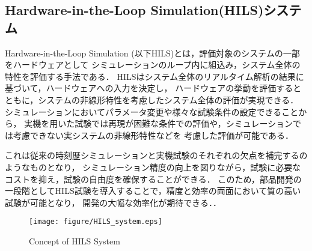 \documentclass[a4paper,12pt]{article_vdlab_sotsuron}
\begin{document}
\newpage
\subsection{Hardware-in-the-Loop Simulation(HILS)システム}
Hardware-in-the-Loop Simulation (以下HILS)とは，評価対象のシステムの一部をハードウェアとして
シミュレーションのループ内に組込み，システム全体の特性を評価する手法である．
HILSはシステム全体のリアルタイム解析の結果に基づいて，ハードウェアへの入力を決定し，
ハードウェアの挙動を評価するとともに，システムの非線形特性を考慮したシステム全体の評価が実現できる．
シミュレーションにおいてパラメータ変更や様々な試験条件の設定できることから，
実機を用いた試験では再現が困難な条件での評価や，シミュレーションでは考慮できない実システムの非線形特性などを
考慮した評価が可能である．

これは従来の時刻歴シミュレーションと実機試験のそれぞれの欠点を補完するのようなものとなり，
シミュレーション精度の向上を図りながら，試験に必要なコストを抑え，試験の自由度を確保することができる．
このため，部品開発の一段階としてHILS試験を導入することで，精度と効率の両面において質の高い試験が可能となり，
開発の大幅な効率化が期待できる．\cite{yamaguchi}．

\vspace{20mm}
\begin{figure}[h]
  \centering
  \texttt{[image: figure/HILS\_system.eps]}
  \vspace{4mm}
   \caption{Concept of HILS System}
  \label{fig:HILSsystem}
\end{figure}

\newpage
\end{document}
